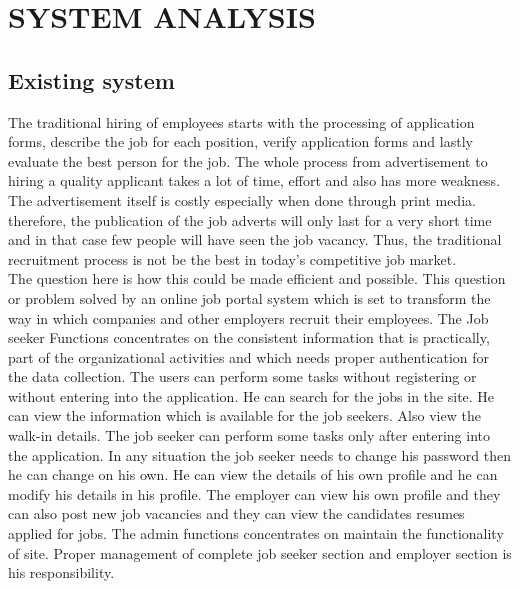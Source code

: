 \documentclass[a4paper,12pt]{report}
\begin{document}
\chapter{SYSTEM ANALYSIS}
\section{Existing system}

\hspace*{12pt}The traditional hiring of employees starts with the processing of application forms, describe the job for each position, verify application forms and lastly evaluate the best person for the job. The whole process from advertisement to hiring a quality applicant takes a lot of time, effort and also has more weakness. The advertisement itself is costly especially when done through print media. therefore, the publication of the job adverts will only last for a very short time and in that case few people will have seen the job vacancy. Thus, the traditional recruitment process is not be the best in today's competitive job market.\\

The question here is how this could be made efficient and possible. This question or problem solved by an online job portal system which is set to transform the way in which companies and other employers recruit their employees. The Job seeker Functions concentrates on the consistent information that is practically, part of the organizational activities and which needs proper authentication for the data collection. The users can perform some tasks without registering or without entering into the application. He can search for the jobs in the site. He can view the information which is available for the job seekers. Also view the walk-in details. The job seeker can perform some tasks only after entering into the application. In any situation the job seeker needs to change his password then he can change on his own. He can view the details of his own profile and he can modify his details in his profile. The employer can view his own profile and they can also post new job vacancies and they can view the candidates resumes applied for jobs. The admin functions concentrates on maintain the functionality of site. Proper management of complete job seeker section and employer section is his responsibility.\\
\end{document}
